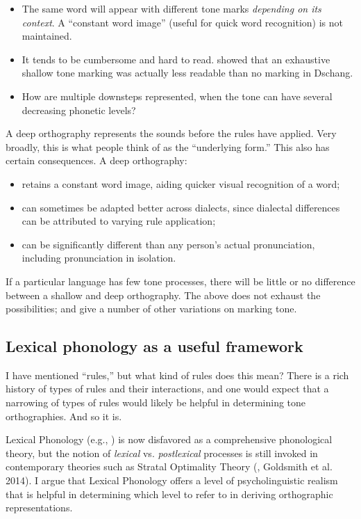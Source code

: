 \documentclass[output=paper]{langscibook}
\begin{document}
\begin{itemize}
    \item The same word will appear with different tone marks \textit{depending on its context}. A “constant word image” (useful for quick word recognition) is not maintained.
    \item It tends to be cumbersome and hard to read. \citet{Bird1999a} showed that an exhaustive shallow tone marking was actually less readable than no marking in Dschang.
    \item How are multiple downsteps represented, when the tone can have several decreasing phonetic levels?
\end{itemize}


A deep orthography represents the sounds before the rules have applied. Very broadly, this is what people think of as the “underlying form.” This also has certain consequences. A deep orthography:

\begin{itemize}
    \item retains a constant word image, aiding quicker visual recognition of a word;
    \item can sometimes be adapted better across dialects, since dialectal differences can be attributed to varying rule application;
    \item can be significantly different than any person’s actual pronunciation, including pronunciation in isolation.
\end{itemize}

If a particular language has few tone processes, there will be little or no difference between a shallow and deep orthography. The above does not exhaust the possibilities; \citet{Bird1999b} and \citet{Roberts2013} give a number of other variations on marking tone.

\subsection{Lexical phonology as a useful framework}
\label{sec:PhonTheoryOrtho:LexicalPhonology:1}

I have mentioned “rules,” but what kind of rules does this mean? There is a rich history of types of rules and their interactions, and one would expect that a narrowing of types of rules would likely be helpful in determining tone orthographies. And so it is.

Lexical Phonology (e.g., \citealt{Pulleyblank1986}) is now disfavored as a comprehensive phonological theory, but the notion of \textit{lexical} vs. \textit{postlexical} processes is still invoked in contemporary theories such as Stratal Optimality Theory (\citealt{Kiparsky2000}, Goldsmith et al. 2014). I argue that Lexical Phonology offers a level of psycholinguistic realism that is helpful in determining which level to refer to in deriving orthographic representations. 
\end{document}
